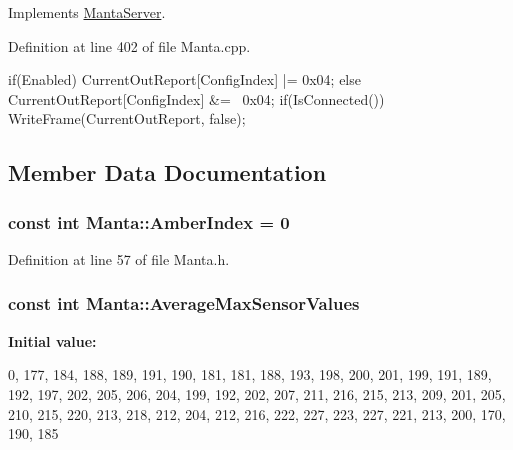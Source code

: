 \-Implements \hyperlink{classMantaServer_a6946dd0d8614b8bb32ef218bfa867cfe}{\-Manta\-Server}.



\-Definition at line 402 of file \-Manta.\-cpp.


\begin{DoxyCode}
{
   if(Enabled)
      CurrentOutReport[ConfigIndex] |= 0x04;
   else
      CurrentOutReport[ConfigIndex] &= ~0x04;
   if(IsConnected())
   {
      WriteFrame(CurrentOutReport, false);
   }
}
\end{DoxyCode}


\subsection{\-Member \-Data \-Documentation}
\hypertarget{classManta_a569d3ec1846c16d58fa157dee5944d5a}{
\subsubsection[{\-Amber\-Index}]{\setlength{\rightskip}{0pt plus 5cm}const int {\bf \-Manta\-::\-Amber\-Index} = 0}}\label{classManta_a569d3ec1846c16d58fa157dee5944d5a}


\-Definition at line 57 of file \-Manta.\-h.

\hypertarget{classManta_aea784dc40ed322b1eefba43e9d714eac}{
\subsubsection[{\-Average\-Max\-Sensor\-Values}]{\setlength{\rightskip}{0pt plus 5cm}const int {\bf \-Manta\-::\-Average\-Max\-Sensor\-Values}}}\label{classManta_aea784dc40ed322b1eefba43e9d714eac}
{\bfseries \-Initial value\-:}
\begin{DoxyCode}
 
{0, 177, 184, 188, 189, 191, 190, 181, 181, 188, 193, 198, 200, 201, 199, 191,
   189, 192, 197, 202, 205, 206, 204, 199, 192, 202, 207, 211, 216, 215, 213,
   209, 201, 205, 210, 215, 220, 213, 218, 212, 204, 212, 216, 222, 227, 223,
   227, 221, 213, 200, 170, 190, 185}
\end{DoxyCode}



